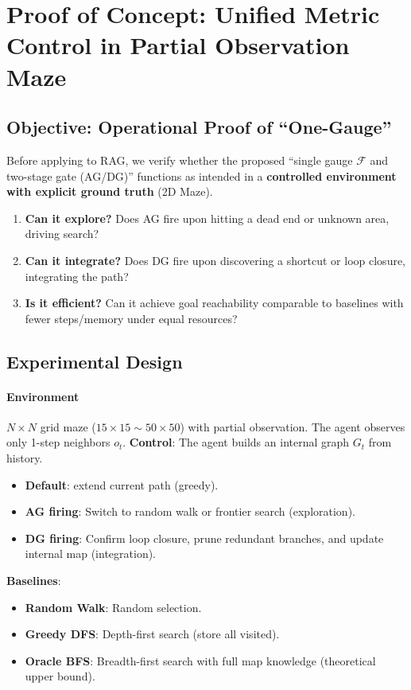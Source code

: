\documentclass[12pt]{article}
\newcommand{\F}{\mathcal{F}}
\begin{document}
\section{Proof of Concept: Unified Metric Control in Partial Observation Maze}
\label{sec:maze_experiment}

\subsection{Objective: Operational Proof of ``One-Gauge''}
Before applying to RAG, we verify whether the proposed ``single gauge $\F$ and two-stage gate (AG/DG)'' functions as intended in a \textbf{controlled environment with explicit ground truth} (2D Maze).
\begin{enumerate}
    \item \textbf{Can it explore?} Does AG fire upon hitting a dead end or unknown area, driving search?
    \item \textbf{Can it integrate?} Does DG fire upon discovering a shortcut or loop closure, integrating the path?
    \item \textbf{Is it efficient?} Can it achieve goal reachability comparable to baselines with fewer steps/memory under equal resources?
\end{enumerate}

\subsection{Experimental Design}
\paragraph{Environment}\;
$N{\times}N$ grid maze ($15{\times}15 \sim 50{\times}50$) with partial observation. The agent observes only 1-step neighbors $o_t$.
\textbf{Control}: The agent builds an internal graph $G_t$ from history.
\begin{itemize}
    \item \textbf{Default}: extend current path (greedy).
    \item \textbf{AG firing}: Switch to random walk or frontier search (exploration).
    \item \textbf{DG firing}: Confirm loop closure, prune redundant branches, and update internal map (integration).
\end{itemize}
\textbf{Baselines}:
\begin{itemize}
    \item \textbf{Random Walk}: Random selection.
    \item \textbf{Greedy DFS}: Depth-first search (store all visited).
    \item \textbf{Oracle BFS}: Breadth-first search with full map knowledge (theoretical upper bound).
\end{itemize}
\end{document}
